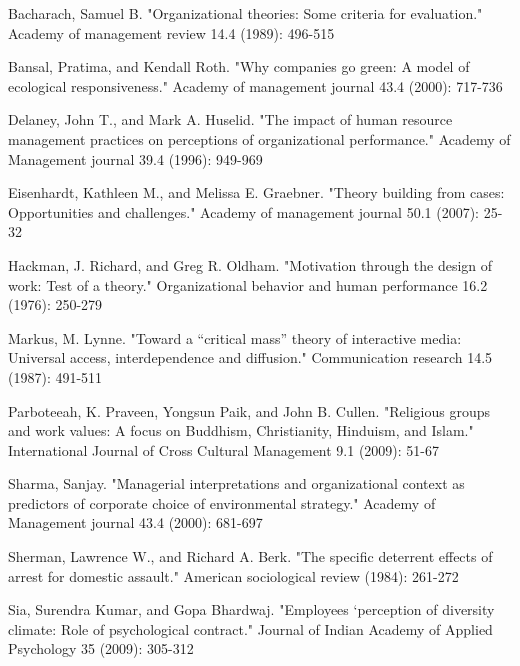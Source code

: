 \begin{description}

	\item Bacharach, Samuel B. "Organizational theories: Some criteria for evaluation." Academy of management review 14.4 (1989): 496-515
	
	\item Bansal, Pratima, and Kendall Roth. "Why companies go green: A model of ecological responsiveness." Academy of management journal 43.4 (2000): 717-736
	
	\item Delaney, John T., and Mark A. Huselid. "The impact of human resource management practices on perceptions of organizational performance." Academy of Management journal 39.4 (1996): 949-969
	
	\item Eisenhardt, Kathleen M., and Melissa E. Graebner. "Theory building from cases: Opportunities and challenges." Academy of management journal 50.1 (2007): 25-32
	
	\item Hackman, J. Richard, and Greg R. Oldham. "Motivation through the design of work: Test of a theory." Organizational behavior and human performance 16.2 (1976): 250-279
	
	\item Markus, M. Lynne. "Toward a “critical mass” theory of interactive media: Universal access, interdependence and diffusion." Communication research 14.5 (1987): 491-511
	
	\item Parboteeah, K. Praveen, Yongsun Paik, and John B. Cullen. "Religious groups and work values: A focus on Buddhism, Christianity, Hinduism, and Islam." International Journal of Cross Cultural Management 9.1 (2009): 51-67
	
	\item Sharma, Sanjay. "Managerial interpretations and organizational context as predictors of corporate choice of environmental strategy." Academy of Management journal 43.4 (2000): 681-697
	
	\item Sherman, Lawrence W., and Richard A. Berk. "The specific deterrent effects of arrest for domestic assault." American sociological review (1984): 261-272
	
	\item Sia, Surendra Kumar, and Gopa Bhardwaj. "Employees ‘perception of diversity climate: Role of psychological contract." Journal of Indian Academy of Applied Psychology 35 (2009): 305-312
	

\end{description}
